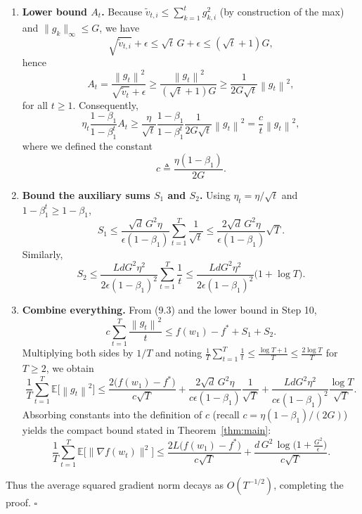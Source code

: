 \documentclass{article}
\newcommand{\E}{\mathbb{E}}
\newcommand{\norm}[1]{\left\lVert #1 \right\rVert}
\begin{document}
\begin{enumerate}
\[\le f(w_{1})-f^{*}
+ \underbrace{\sum_{t=1}^{T}\frac{\sqrt{d}\,G^{2}\eta_{t}}{\epsilon(1-\beta_{1}^{t})}}_{\text{Term }S_{1}}
+ \underbrace{\sum_{t=1}^{T}\frac{L d G^{2}\eta_{t}^{2}}{2\epsilon(1-\beta_{1}^{t})^{2}}}_{\text{Term }S_{2}}.
\tag{9.3}
\]
\item[Step 10.] \textbf{Lower bound $A_{t}$.}  
Because $\tilde v_{t,i}\le \sum_{k=1}^{t}g_{k,i}^{2}$ (by construction of the max) and $\|g_{k}\|_{\infty}\le G$, we have
\[
\sqrt{\tilde v_{t,i}}+\epsilon\le \sqrt{t}\,G +\epsilon\le (\sqrt{t}+1)G,
\]
hence
\[
A_{t}= \frac{\norm{g_{t}}^{2}}{\sqrt{\tilde v_{t}}+\epsilon}
\ge \frac{\norm{g_{t}}^{2}}{(\sqrt{t}+1)G}
\ge \frac{1}{2G\sqrt{t}}\norm{g_{t}}^{2},
\]
for all $t\ge 1$. Consequently,
\[
\eta_{t}\frac{1-\beta_{1}}{1-\beta_{1}^{t}}A_{t}
\ge \frac{\eta}{\sqrt{t}}\frac{1-\beta_{1}}{1-\beta_{1}^{t}}\frac{1}{2G\sqrt{t}}\norm{g_{t}}^{2}
= \frac{c}{t}\norm{g_{t}}^{2},
\]
where we defined the constant
\[
c\triangleq \frac{\eta(1-\beta_{1})}{2G}.
\tag{10.1}
\]
\item[Step 11.] \textbf{Bound the auxiliary sums $S_{1}$ and $S_{2}$.}  
Using $\eta_{t}= \eta/\sqrt{t}$ and $1-\beta_{1}^{t}\ge 1-\beta_{1}$,
\[
S_{1}\le \frac{\sqrt{d}\,G^{2}\eta}{\epsilon(1-\beta_{1})}\sum_{t=1}^{T}\frac{1}{\sqrt{t}}
\le \frac{2\sqrt{d}\,G^{2}\eta}{\epsilon(1-\beta_{1})}\sqrt{T}.
\tag{11.1}
\]
Similarly,
\[
S_{2}\le \frac{L d G^{2}\eta^{2}}{2\epsilon(1-\beta_{1})^{2}}\sum_{t=1}^{T}\frac{1}{t}
\le \frac{L d G^{2}\eta^{2}}{2\epsilon(1-\beta_{1})^{2}}\bigl(1+\log T\bigr).
\tag{11.2}
\]
\item[Step 12.] \textbf{Combine everything.}  
From (9.3) and the lower bound in Step 10,
\[
c\sum_{t=1}^{T}\frac{\norm{g_{t}}^{2}}{t}
\le f(w_{1})-f^{*}+S_{1}+S_{2}.
\]
Multiplying both sides by $1/T$ and noting $\frac{1}{T}\sum_{t=1}^{T}\frac{1}{t}\le \frac{\log T +1}{T}\le \frac{2\log T}{T}$ for $T\ge 2$, we obtain
\[
\frac{1}{T}\sum_{t=1}^{T}\E\!\bigl[\norm{g_{t}}^{2}\bigr]
\le
\frac{2\bigl(f(w_{1})-f^{*}\bigr)}{c\sqrt{T}}
+ \frac{2\sqrt{d}\,G^{2}\eta}{c\epsilon(1-\beta_{1})}\frac{1}{\sqrt{T}}
+ \frac{L d G^{2}\eta^{2}}{c\epsilon(1-\beta_{1})^{2}}\frac{\log T}{\sqrt{T}}.
\]
Absorbing constants into the definition of $c$ (recall $c=\eta(1-\beta_{1})/(2G)$) yields the compact bound stated in Theorem~\ref{thm:main}:
\[
\frac{1}{T}\sum_{t=1}^{T}\E\!\bigl[\|\nabla f(w_{t})\|^{2}\bigr]
\le
\frac{2L\bigl(f(w_{1})-f^{*}\bigr)}{c\sqrt{T}}
+ \frac{d\,G^{2}\,\log\!\bigl(1+\tfrac{G^{2}}{\epsilon}\bigr)}{c\sqrt{T}}.
\]
\end{enumerate}
Thus the average squared gradient norm decays as $O(T^{-1/2})$, completing the proof. \hfill $\square$
\end{document}
